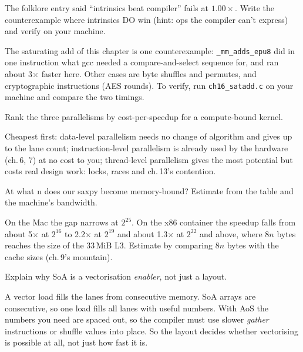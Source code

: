 \begin{exercise}[hard]
The folklore entry said ``intrinsics beat compiler'' fails at
$1.00\times$. Write the counterexample where intrinsics DO win
(hint: ops the compiler can't express) and verify on your machine.
\end{exercise}
\begin{solution}
The saturating add of this chapter is one counterexample:
\texttt{\_mm\_adds\_epu8} did in one instruction what gcc needed a
compare-and-select sequence for, and ran about 3$\times$ faster here. Other
cases are byte shuffles and permutes, and cryptographic instructions (AES
rounds). To verify, run \texttt{ch16\_satadd.c} on your machine and
compare the two timings.
\end{solution}
\begin{exercise}[easy]
Rank the three parallelisms by cost-per-speedup for a
compute-bound kernel.
\end{exercise}
\begin{solution}
Cheapest first: data-level parallelism needs no change of algorithm and
gives up to the lane count; instruction-level parallelism is already used
by the hardware (ch.\,6, 7) at no cost to you; thread-level parallelism
gives the most potential but costs real design work: locks, races and
ch.\,13's contention.
\end{solution}
\begin{exercise}[medium]
At what n does our saxpy become memory-bound? Estimate from the
table and the machine's bandwidth.
\end{exercise}
\begin{solution}
On the Mac the gap narrows at $2^{25}$. On the x86 container the
speedup falls from about 5$\times$ at $2^{16}$ to 2.2$\times$ at $2^{19}$ and
about 1.3$\times$ at $2^{22}$ and above, where $8n$ bytes reaches the size of
the 33\,MiB L3. Estimate by comparing $8n$ bytes with the cache sizes
(ch.\,9's mountain).
\end{solution}
\begin{exercise}[medium]
Explain why SoA is a vectorisation \emph{enabler}, not just a
layout.
\end{exercise}
\begin{solution}
A vector load fills the lanes from consecutive memory. SoA arrays are
consecutive, so one load fills all lanes with useful numbers. With AoS the
numbers you need are spaced out, so the compiler must use slower
\emph{gather} instructions or shuffle values into place. So the layout
decides whether vectorising is possible at all, not just how fast it is.
\end{solution}
